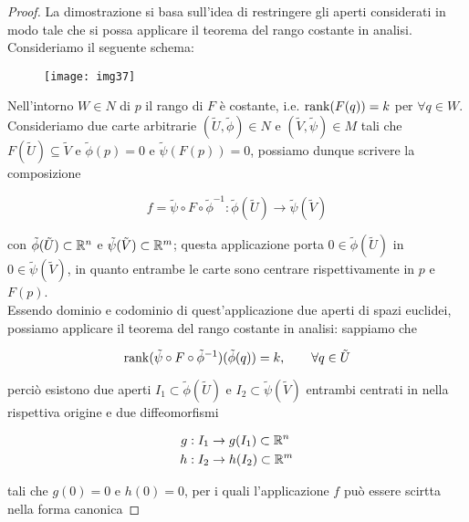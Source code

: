 \begin{proof}
	La dimostrazione si basa sull'idea di restringere gli aperti considerati in modo tale che si possa applicare il teorema del rango costante in analisi.\\
	Consideriamo il seguente schema:
	
	\begin{figure}[H]
		\centering
		\texttt{[image: img37]}
	\end{figure}

	Nell'intorno $ W \in N $ di $ p $ il rango di $ F $ è costante, i.e. $ \rank(F(q)) = k $ per $ \forall q \in W $. Consideriamo due carte arbitrarie $ (\tilde{U},\tilde{\phi}) \in N $ e $ (\tilde{V},\tilde{\psi}) \in M $ tali che $ F(\tilde{U}) \subseteq \tilde{V} $ e $ \tilde{\phi}(p) = 0 $ e $ \tilde{\psi}(F(p)) = 0 $, possiamo dunque scrivere la composizione
	
	\begin{equation}
		f = \tilde{\psi} \circ F \circ \tilde{\phi}^{-1} : \tilde{\phi}(\tilde{U}) \to \tilde{\psi}(\tilde{V})
	\end{equation}

	con $ \tilde{\phi}(\tilde{U}) \subset \mathbb{R}^{n} $ e $ \tilde{\psi}(\tilde{V}) \subset \mathbb{R}^{m} $; questa applicazione porta $ 0 \in \tilde{\phi}(\tilde{U}) $ in $ 0 \in \tilde{\psi}(\tilde{V}) $, in quanto entrambe le carte sono centrare rispettivamente in $ p $ e $ F(p) $.\\
	Essendo dominio e codominio di quest'applicazione due aperti di spazi euclidei, possiamo applicare il teorema del rango costante in analisi: sappiamo che
	
	\begin{equation}
		\rank(\tilde{\psi} \circ F \circ \tilde{\phi}^{-1})(\tilde{\phi}(q)) = k, \qquad \forall q \in \tilde{U}
	\end{equation}

	perciò esistono due aperti $ I_{1} \subset \tilde{\phi}(\tilde{U}) $ e $ I_{2} \subset \tilde{\psi}(\tilde{V}) $ entrambi centrati in nella rispettiva origine e due diffeomorfismi
	
	\begin{align}
		\begin{split}
			g : I_{1} &\to g(I_{1}) \subset \mathbb{R}^{n}\\
			h : I_{2} &\to h(I_{2}) \subset \mathbb{R}^{m}
		\end{split}
	\end{align}

	tali che $ g(0)=0 $ e $ h(0)=0 $, per i quali l'applicazione $ f $ può essere scirtta nella forma canonica
	

\end{proof}
